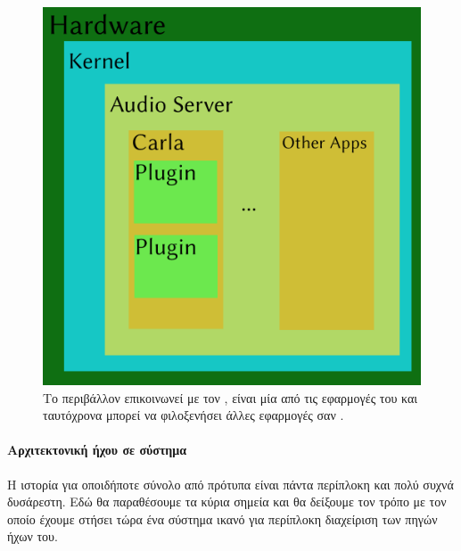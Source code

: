 \documentclass[12pt]{extarticle}
\begin{document}
\begin{figure}[htpb]
    \centering
    \includegraphics[width=\textwidth]{./assets/insides.png}
    \caption{Το περιβάλλον  επικοινωνεί με τον , είναι μία από τις εφαρμογές του και ταυτόχρονα μπορεί να φιλοξενήσει άλλες εφαρμογές σαν .}
\end{figure}



\paragraph{Αρχιτεκτονική ήχου σε  σύστημα}

Η ιστορία για οποιδήποτε σύνολο από πρότυπα είναι πάντα περίπλοκη 
και πολύ συχνά δυσάρεστη. Εδώ θα παραθέσουμε τα κύρια σημεία 
και θα δείξουμε τον τρόπο με τον οποίο έχουμε στήσει τώρα ένα σύστημα 
ικανό για περίπλοκη διαχείριση των πηγών ήχων του. 
\end{document}
